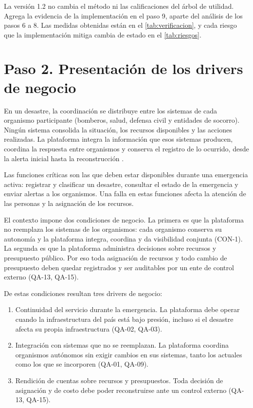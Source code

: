 \documentclass[11pt,letterpaper]{article}
\begin{document}
La versión 1.2 no cambia el método ni las calificaciones del árbol de utilidad. Agrega la evidencia
de la implementación en el paso 9, aparte del análisis de los pasos 6 a 8. Las medidas obtenidas están
en el \cref{tab:verificacion}, y cada riesgo que la implementación mitiga cambia de estado en el
\cref{tab:riesgos}.

\section{Paso 2. Presentación de los drivers de negocio}
\label{sec:paso2}

En un desastre, la coordinación se distribuye entre los sistemas de cada organismo participante
(bomberos, salud, defensa civil y entidades de socorro). Ningún sistema consolida la situación, los
recursos disponibles y las acciones realizadas. La plataforma integra la información que esos
sistemas producen, coordina la respuesta entre organismos y conserva el registro de lo ocurrido,
desde la alerta inicial hasta la reconstrucción \cite{enunciado,srs}.

Las funciones críticas son las que deben estar disponibles durante una emergencia activa: registrar
y clasificar un desastre, consultar el estado de la emergencia y enviar alertas a los organismos.
Una falla en estas funciones afecta la atención de las personas y la asignación de los recursos.

El contexto impone dos condiciones de negocio. La primera es que la plataforma no reemplaza los
sistemas de los organismos: cada organismo conserva su autonomía y la plataforma integra, coordina
y da visibilidad conjunta (CON-1). La segunda es que la plataforma administra decisiones sobre
recursos y presupuesto público. Por eso toda asignación de recursos y todo cambio de presupuesto
deben quedar registrados y ser auditables por un ente de control externo (QA-13, QA-15).

De estas condiciones resultan tres drivers de negocio:

\begin{enumerate}
  \item Continuidad del servicio durante la emergencia. La plataforma debe operar cuando la
        infraestructura del país está bajo presión, incluso si el desastre afecta su propia
        infraestructura (QA-02, QA-03).
  \item Integración con sistemas que no se reemplazan. La plataforma coordina organismos autónomos
        sin exigir cambios en sus sistemas, tanto los actuales como los que se incorporen (QA-01,
        QA-09).
  \item Rendición de cuentas sobre recursos y presupuestos. Toda decisión de asignación y de costo
        debe poder reconstruirse ante un control externo (QA-13, QA-15).
\end{enumerate}
\end{document}
